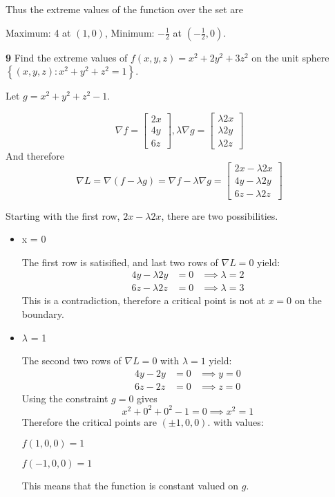 \documentclass{article}
\begin{document}
Thus the extreme values of the function over the set are 

Maximum: 4 at $(1, 0)$, Minimum: $-\frac{1}{2}$ at $(-\frac{1}{2}, 0)$.


\noindent \textbf{9} Find the extreme values of $f(x, y, z) = x^2 + 2y^2 + 3z^2$ on 
the unit sphere $\left\{(x, y, z) : x^2 + y^2 + z^2 = 1\right\}$.

Let $g = x^2 + y^2 + z^2 - 1$.

$$
\nabla f = \begin{bmatrix} 2x \\ 4y \\ 6z \end{bmatrix}, 
\lambda \nabla g = \begin{bmatrix} \lambda 2x \\ \lambda 2y \\ \lambda 2z\end{bmatrix}
$$
And therefore 
$$ \nabla L = \nabla (f - \lambda g) = \nabla f - \lambda \nabla g = 
\begin{bmatrix}
2x - \lambda 2x \\
4y - \lambda 2y \\ 
6z - \lambda 2z 
\end{bmatrix}
$$

Starting with the first row, $2x - \lambda 2x$, there are two possibilities. 

\begin{itemize}
\item x = 0

The first row is satisified, and last two rows of $\nabla L = 0$ yield: 
$$
\begin{matrix}
4y - \lambda 2y & = 0 & \implies \lambda = 2\\
6z - \lambda 2z & = 0 & \implies \lambda = 3
\end{matrix}
$$
This is a contradiction, therefore a critical point is not at $x = 0$ on the boundary. 

\newpage
\item $\lambda$ = 1

The second two rows of $\nabla L = 0$ with $\lambda = 1$ yield: 
$$
\begin{matrix}
4y - 2y & = 0 & \implies y = 0\\
6z - 2z & = 0 & \implies z = 0
\end{matrix}
$$
Using the constraint $g = 0$ gives 
$$
x^2 + 0^2 + 0^2 - 1 = 0 \implies x^2 = 1
$$
Therefore the critical points are $(\pm 1, 0, 0)$. with values: 

$f(1, 0, 0) = 1$

$f(-1, 0, 0) = 1$

This means that the function is constant valued on $g$. 
\end{itemize}
\end{document}
